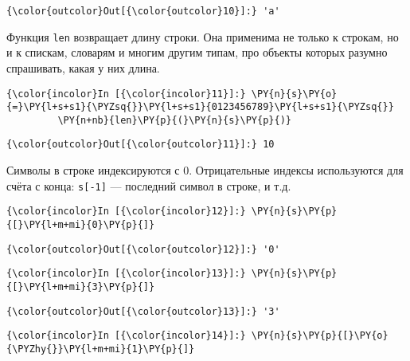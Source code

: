             \begin{Verbatim}[commandchars=\\\{\}]
{\color{outcolor}Out[{\color{outcolor}10}]:} 'а'
\end{Verbatim}
        
    Функция \texttt{len} возвращает длину строки. Она применима не только к
строкам, но и к спискам, словарям и многим другим типам, про объекты
которых разумно спрашивать, какая у них длина.

    \begin{Verbatim}[commandchars=\\\{\}]
{\color{incolor}In [{\color{incolor}11}]:} \PY{n}{s}\PY{o}{=}\PY{l+s+s1}{\PYZsq{}}\PY{l+s+s1}{0123456789}\PY{l+s+s1}{\PYZsq{}}
         \PY{n+nb}{len}\PY{p}{(}\PY{n}{s}\PY{p}{)}
\end{Verbatim}

            \begin{Verbatim}[commandchars=\\\{\}]
{\color{outcolor}Out[{\color{outcolor}11}]:} 10
\end{Verbatim}
        
    Символы в строке индексируются с 0. Отрицательные индексы используются
для счёта с конца: \texttt{s{[}-1{]}} --- последний символ в строке, и
т.д.

    \begin{Verbatim}[commandchars=\\\{\}]
{\color{incolor}In [{\color{incolor}12}]:} \PY{n}{s}\PY{p}{[}\PY{l+m+mi}{0}\PY{p}{]}
\end{Verbatim}

            \begin{Verbatim}[commandchars=\\\{\}]
{\color{outcolor}Out[{\color{outcolor}12}]:} '0'
\end{Verbatim}
        
    \begin{Verbatim}[commandchars=\\\{\}]
{\color{incolor}In [{\color{incolor}13}]:} \PY{n}{s}\PY{p}{[}\PY{l+m+mi}{3}\PY{p}{]}
\end{Verbatim}

            \begin{Verbatim}[commandchars=\\\{\}]
{\color{outcolor}Out[{\color{outcolor}13}]:} '3'
\end{Verbatim}
        
    \begin{Verbatim}[commandchars=\\\{\}]
{\color{incolor}In [{\color{incolor}14}]:} \PY{n}{s}\PY{p}{[}\PY{o}{\PYZhy{}}\PY{l+m+mi}{1}\PY{p}{]}
\end{Verbatim}

